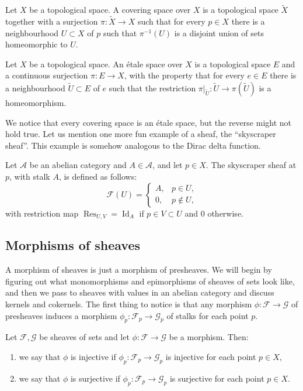 \begin{definition}
Let $X$ be a topological space. A covering space over $X$ is a topological
space $\widetilde X$ together with a surjection $\pi:\widetilde X\to X$ such that for every $p\in X$ there is a
neighbourhood $U\subset X$ of $p$ such that $\pi^{-1}(U)$ is a disjoint union of sets homeomorphic to $U$.
\end{definition}

\begin{definition}
Let $X$ be a topological space. An étale space over $X$ is a topological space
$E$ and a continuous surjection $\pi:E\to X$, with the property that for every $e\in E$ there is a
neighbourhood $\widetilde U\subset E$ of $e$ such that the restriction
$\pi|_{\widetilde U}:\widetilde U\to\pi(\widetilde U)$ is a homeomorphism.
\end{definition}

We notice that every covering space is an étale space, but the reverse might not hold true.
Let us mention one more fun example of a sheaf, the “skyscraper sheaf”. This example is
somehow analogous to the Dirac delta function.

\begin{definition}
\label{definition-skyscraper}
Let $\mathcal A$ be an abelian category and $A\in\mathcal A$, and let $p\in X$. The skyscraper
sheaf at $p$, with stalk $A$, is defined as follows:
\[
\mathcal F(U)=
\begin{cases}
A,&p\in U,\\
0,&p\notin U,
\end{cases}
\]
with restriction map $\operatorname{Res}_{U,V}=\operatorname{Id}_A$ if $p\in V\subset U$ and $0$ otherwise.
\end{definition}

\subsection{Morphisms of sheaves}
\label{subsection-morphisms-of-sheaves}

A morphism of sheaves is just a morphism of presheaves. We will begin by figuring out
what monomorphisms and epimorphisms of sheaves of sets look like, and then we pass to
sheaves with values in an abelian category and discuss kernels and cokernels. The first thing
to notice is that any morphism $\phi:\mathcal F\to\mathcal G$ of presheaves induces a morphism
$\phi_p:\mathcal F_p\to\mathcal G_p$ of stalks for each point $p$.

\begin{definition}
Let $\mathcal F,\mathcal G$ be sheaves of sets and let $\phi:\mathcal F\to\mathcal G$ be a morphism. Then:
\begin{enumerate}
\item we say that $\phi$ is injective if $\phi_p:\mathcal F_p\to\mathcal G_p$ is injective for each point $p\in X$,
\item we say that $\phi$ is surjective if $\phi_p:\mathcal F_p\to\mathcal G_p$ is surjective for each point $p\in X$.
\end{enumerate}
\end{definition}

